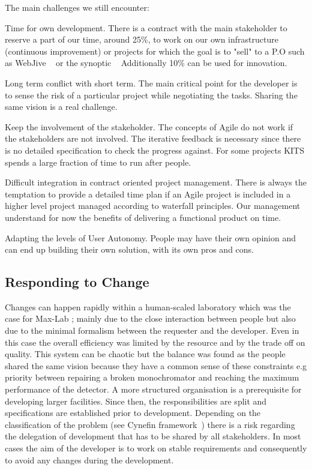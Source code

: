 \documentclass[a4paper,
              ]{jacow}
\begin{document}
The main challenges we still encounter:
\begin{Itemize}
      \item Time for own development.
      There is a contract with the main stakeholder to reserve a part of our time, around 25\%, to work on our own infrastructure (continuous improvement) or projects for which the goal is to "sell" to a P.O such as WebJive ~\cite{webjive} or the synoptic ~\cite{synoptic}
      Additionally 10\% can be used for innovation.
      \item Long term conflict with short term.
      The main critical point for the developer is to sense the risk of a particular project while negotiating the tasks. Sharing the same vision is a real challenge.
      \item Keep the involvement of the stakeholder.
      The concepts of Agile do not work if the stakeholders are not involved. The iterative feedback is necessary since there is no detailed specification to check the progress against.
      For some projects KITS spends a large fraction of time to run after people.
      \item Difficult integration in contract oriented project management.
      There is always the temptation to provide a detailed time plan if an Agile project is included in a higher level project managed according to waterfall principles. Our management understand for now the benefits of delivering a functional product on time.
      \item Adapting the levels of User Autonomy.
      People may have their own opinion and can end up building their own solution, with its own pros and cons.
\end{Itemize}

\subsection{Responding to Change}
Changes can happen rapidly within a human-scaled laboratory which was the case for Max-Lab ; mainly due to the close interaction between people but also due to the minimal formalism between the requester and the developer. Even in this case the overall efficiency was limited by the resource and by the trade off on quality. This system can be chaotic but the balance was found as the people shared the same vision because they have a common sense of these constraints e.g priority between repairing a broken monochromator and reaching the maximum performance of the detector.
A more structured organisation is a prerequisite for developing larger facilities. Since then, the responsibilities are split and specifications are established prior to development. Depending on the classification of the problem (see Cynefin framework~\cite{cynefin}) there is a risk regarding the delegation of development that has to be shared by all stakeholders. In most cases the aim of the developer is to work on stable requirements and consequently to avoid any changes during the development.
\end{document}
